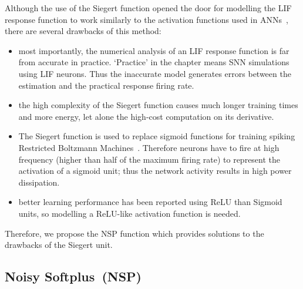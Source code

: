 	
\DIFaddend %
		Although the use of the Siegert function opened the door for modelling the LIF response function to work similarly to the activation functions used in ANNs~\citep{Jug_etal_2012}, there are several drawbacks of this method:
	\begin{itemize}
		\item most importantly, the numerical analysis of an LIF response function is far from accurate in practice. `Practice' in the chapter means SNN simulations using LIF neurons.
		Thus the inaccurate model generates errors between the estimation and the practical response firing rate.

		
		\item the high complexity of the Siegert function causes much longer training times and more energy, let alone the high-cost computation on its derivative.
		\item The Siegert function is used to replace sigmoid functions for training spiking Restricted Boltzmann Machines~\DIFaddbegin {}\DIFaddend \citep{Jug_etal_2012}.
		Therefore neurons have to fire at high frequency (higher than half of the maximum firing rate) to represent the activation of a sigmoid unit; thus the network activity results in high power dissipation.
		\item better learning performance has been reported using ReLU than Sigmoid units, so modelling \DIFaddbegin {}\DIFaddend a ReLU-like activation function \DIFdelbegin {}\DIFdelend is needed.  
	\end{itemize}

	Therefore, we propose the NSP function which provides solutions to the drawbacks of the Siegert unit.

		
	\subsection{Noisy Softplus~(NSP)}
	\label{sec:NSP}
	\DIFdelbegin %

